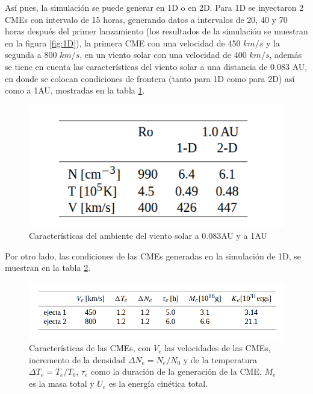 Así pues, la simulación se puede generar en 1D o en 2D. Para 1D se inyectaron 2 \acp{CME} con intervalo de 15 horas, generando datos a intervalos de 20, 40 y 70 horas después del primer lanzamiento (los resultados de la simulación se muestran en la figura \ref{fig:1D}), la primera \ac{CME} con una velocidad de 450 $km/s$ y la segunda a 800 $km/s$, en un viento solar con una velocidad de 400 $km/s$, además se tiene en cuenta las características del viento solar a una distancia de 0.083 AU, en donde se colocan condiciones de frontera (tanto para 1D como para 2D) así como a 1AU, mostradas en la tabla \ref{fig:condiciones de contorno}.


\begin{figure}[H]
    \centering
    \includegraphics[width=0.4\linewidth]{imag/condiciones de contorno.png}
    \caption{Características del ambiente del viento solar a 0.083AU y a 1AU}
    \label{fig:condiciones de contorno}
\end{figure}

Por otro lado, las condiciones de las \acp{CME} generadas en la simulación de 1D, se muestran en la tabla \ref{fig:caracteristicas de las CMEs}.
\begin{figure}[H]
    \centering
    \includegraphics[width=0.7\linewidth]{imag/condicones CMEs.png}
    \caption{Características de las CMEs, con $V_e$ las velocidades de las CMEs, incremento de la densidad $\Delta N_e=N_e/N_0$ y de la temperatura $\Delta T_e=T_e/T_0$, $\tau_e$ como la duración de la generación de la CME, $M_e$ es la masa total y $U_e$ es la energía cinética total.}
    \label{fig:caracteristicas de las CMEs}
\end{figure}

